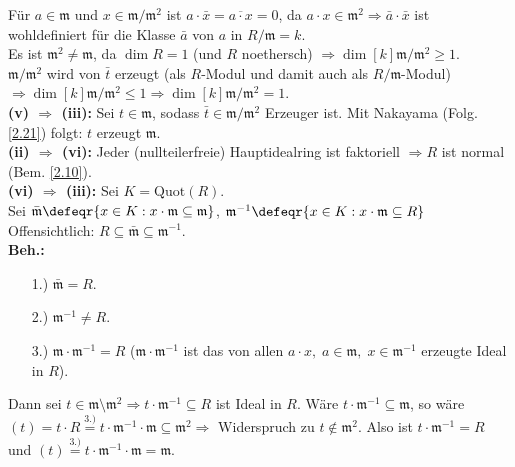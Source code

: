 \begin{Bew}
Für $a \in \mathfrak{m}$ und $x \in \mathfrak{m}/\mathfrak{m}^2$ ist $a \cdot
\bar{x} = \overline{a \cdot x} = 0$, da $a \cdot x \in \mathfrak{m}^2
\Rightarrow \bar{a} \cdot \bar{x}$ ist wohldefiniert für die Klasse $\bar{a}$
von $a$ in $R/\mathfrak{m} = k$.\\
Es ist $\mathfrak{m}^2 \not= \mathfrak{m}$, da $\dim R = 1$ (und $R$ noethersch)
$\Rightarrow \dim[k]{\mathfrak{m} / \mathfrak{m}^2} \geq 1$.\\
$\mathfrak{m}/\mathfrak{m}^2$ wird von $\bar{t}$ erzeugt (als $R$-Modul und
damit auch als $R/\mathfrak{m}$-Modul) $\Rightarrow \dim[k]{\mathfrak{m}/
\mathfrak{m}^2} \leq 1 \Rightarrow \dim[k]{\mathfrak{m}/\mathfrak{m}^2} = 1$.\\
\textbf{(v) $\Rightarrow$ (iii):} Sei $t \in \mathfrak{m}$, sodass $\bar{t} \in
\mathfrak{m}/\mathfrak{m}^2$ Erzeuger ist. Mit Nakayama (Folg. \ref{2.21}) folgt:
$t$ erzeugt $\mathfrak{m}$.\\
\textbf{(ii) $\Rightarrow$ (vi):} Jeder (nullteilerfreie) Hauptidealring ist
faktoriell $\Rightarrow R$ ist normal (Bem. \ref{2.10}).\\
\textbf{(vi) $\Rightarrow$ (iii):} Sei $K = \mathrm{Quot}(R)$.\\
Sei $\bar{\mathfrak{m}} \defeqr \{x \in K: x \cdot \mathfrak{m} \subseteq
\mathfrak{m}\}$, $\mathfrak{m}^{-1} \defeqr \{x \in K: x \cdot \mathfrak{m}
\subseteq R\}$\\
Offensichtlich: $R \subseteq \bar{\mathfrak{m}} \subseteq \mathfrak{m}^{-1}$.\\
\textbf{Beh.:} \begin{enumerate}
  \item[1.)] $\bar{\mathfrak{m}} = R$.
  \item[2.)] $\mathfrak{m}^{-1} \not= R$.
  \item[3.)] $\mathfrak{m} \cdot \mathfrak{m}^{-1}=R$ ($\mathfrak{m} \cdot
  \mathfrak{m}^{-1}$ ist das von allen $a \cdot x, \; a \in \mathfrak{m}, \; x
  \in \mathfrak{m}^{-1}$ erzeugte Ideal in $R$).
\end{enumerate}
Dann sei $t \in \mathfrak{m} \setminus \mathfrak{m}^2 \Rightarrow t \cdot
\mathfrak{m}^{-1} \subseteq R$ ist Ideal in $R$.
Wäre $ t \cdot \mathfrak{m}^{-1} \subseteq \mathfrak{m}$, so wäre $(t) = t \cdot
R \overset{3.)}{=} t \cdot \mathfrak{m}^{-1} \cdot \mathfrak{m} \subseteq
\mathfrak{m}^2 \Rightarrow$ Widerspruch zu $t \not\in \mathfrak{m}^2$.
Also ist $t \cdot \mathfrak{m}^{-1} = R$ und $(t) \overset{3.)}{=} t \cdot
\mathfrak{m}^{-1} \cdot \mathfrak{m} = \mathfrak{m}$.\\

\end{Bew}
